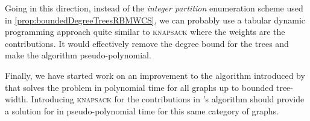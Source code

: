 		Going in this direction, instead of the \emph{integer partition} enumeration scheme used in \cref{prop:boundedDegreeTreesRBMWCS}, we can probably use a tabular dynamic programming approach quite similar to \textsc{knapsack} where the weights are the contributions.
		It would effectively remove the degree bound for the trees and make the algorithm pseudo-polynomial.

		Finally, we have started work on an improvement to the algorithm introduced by \textcite{bateni2011prize} that solves the \mwcs{} problem in polynomial time for all graphs up to bounded tree-width.
		Introducing \textsc{knapsack} for the contributions in \textcite{bateni2011prize}'s algorithm should provide a solution for \rbmwcs{} in pseudo-polynomial time for this same category of graphs.
